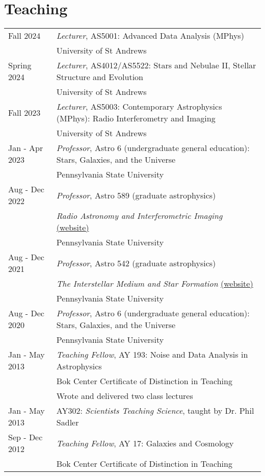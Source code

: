 \section*{Teaching}
\begin{tabular*}{\textwidth}{@{\hspace{10pt}}p{1.4in}l}
Fall 2024 & \emph{Lecturer}, AS5001: Advanced Data Analysis (MPhys)\\
& University of St Andrews \\
Spring 2024 & \emph{Lecturer}, AS4012/AS5522: Stars and Nebulae II, Stellar Structure and Evolution \\
& University of St Andrews \\
Fall 2023 & \emph{Lecturer}, AS5003: Contemporary Astrophysics (MPhys): Radio Interferometry and Imaging \\
& University of St Andrews \\
Jan - Apr 2023 & \emph{Professor}, Astro 6 (undergraduate general education): Stars, Galaxies, and the Universe\\
& Pennsylvania State University \\    
Aug - Dec 2022 & \emph{Professor}, Astro 589 (graduate astrophysics)\\
& \emph{Radio Astronomy and Interferometric Imaging} \href{https://iancze.github.io/courses/astro589/}{(website)}\\    
& Pennsylvania State University \\ 
Aug - Dec 2021 & \emph{Professor}, Astro 542 (graduate astrophysics)\\
& \emph{The Interstellar Medium and Star Formation} \href{https://iancze.github.io/courses/astro542/}{(website)}\\    
& Pennsylvania State University \\ 
Aug - Dec 2020 & \emph{Professor}, Astro 6 (undergraduate general education): Stars, Galaxies, and the Universe\\
& Pennsylvania State University \\ 
Jan - May 2013 & \emph{Teaching Fellow}, AY 193: Noise and Data Analysis in Astrophysics\\
& Bok Center Certificate of Distinction in Teaching\\
& Wrote and delivered two class lectures\\
Jan - May 2013 & AY302: \emph{Scientists Teaching Science}, taught by Dr. Phil Sadler\\
Sep - Dec 2012 & \emph{Teaching Fellow}, AY 17: Galaxies and Cosmology\\
& Bok Center Certificate of Distinction in Teaching\\
\end{tabular*}
